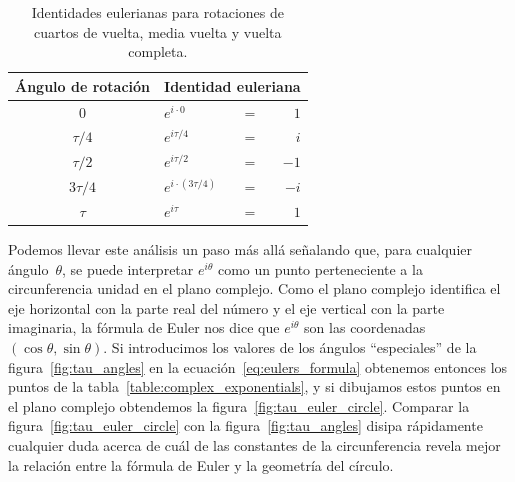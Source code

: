 \begin{table}
\begin{center}
\begin{tabular}{cllr}
Ángulo de rotación & \multicolumn{3}{c}{Identidad euleriana} \\ \hline
$0$ & $e^{i\cdot0}$ & $ = $ & $1$ \smallskip \\
$\tau/4$ & $e^{i\tau/4}$ & $ = $ & $i$ \smallskip \\
$\tau/2$ & $e^{i\tau/2}$ & $ = $ & $-1$ \smallskip \\
$3\tau/4$ & $e^{i\cdot(3\tau/4)}$ & $ = $ & $-i$ \smallskip \\
$\tau$ & $e^{i\tau}$ & $ = $ & $1$
\end{tabular}
\end{center}
\caption{Identidades eulerianas para rotaciones de cuartos de vuelta, media vuelta y vuelta completa.\label{table:eulerian_identities}}
\end{table}


Podemos llevar este análisis un paso más allá señalando que, para cualquier ángulo~$\theta$, se puede interpretar $e^{i\theta}$ como un punto perteneciente a la circunferencia unidad en el plano complejo. Como el plano complejo identifica el eje horizontal con la parte real del número y el eje vertical con la parte imaginaria, la fórmula de Euler nos dice que $e^{i\theta}$ son las coordenadas $(\cos\theta, \sin\theta)$. Si introducimos los valores de los ángulos ``especiales'' de la figura~\ref{fig:tau_angles} en la ecuación~\eqref{eq:eulers_formula} obtenemos entonces los puntos de la tabla~\ref{table:complex_exponentials}, y si dibujamos estos puntos en el plano complejo obtendemos la figura~\ref{fig:tau_euler_circle}. Comparar la figura~\ref{fig:tau_euler_circle} con la figura~\ref{fig:tau_angles} disipa rápidamente cualquier duda acerca de cuál de las constantes de la circunferencia revela mejor la relación entre la fórmula de Euler y la geometría del círculo.

